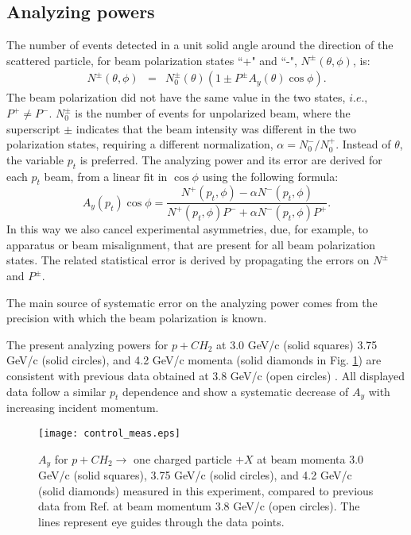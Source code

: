 \documentclass[epj]{svjour}
\newcommand\ba{\begin{eqnarray}}
\newcommand\ea{\end{eqnarray}}
\newcommand{\be}{\begin{equation}}
\newcommand{\ee}{\end{equation}}
\begin{document}
\subsection{Analyzing powers}
The number of events detected in a unit solid angle around the direction of the scattered particle,  for beam polarization states ``+" and ``-", $N^{\pm}(\theta, \phi)$, is:
\ba
N^{\pm} (\theta, \phi)&=& N_{0}^{\pm}(\theta) (1\pm P^{\pm} A_{y}(\theta)\cos\phi).
\ea
The beam polarization did not have the same value  in the two states, $i.e.,$ 
$P^{+} \neq P^{-} $.  $N_{0}^{\pm}$ is the number of events for unpolarized beam, where the superscript ${\pm}$ indicates  that the beam intensity was different in the two polarization states, requiring a different normalization, $\alpha=N_{0}^-/N_{0}^+$.
Instead of $\theta$, the variable $p_t$ is preferred. 
The analyzing power and its error are derived for each $p_t$ beam, from a linear fit in $\cos\phi $
using  the following formula:
\be
A_{y}(p_t) \cos\phi =\displaystyle\frac{N^+(p_t,\phi)- \alpha N^-(p_t,\phi)}
{N^+(p_t,\phi)P^- + \alpha N^-(p_t,\phi) P^+ }. 
\label{Eq:Asym}
\ee
In this way we also cancel experimental asymmetries, due, for example, to apparatus or beam misalignment, that are present for all beam polarization states. The related statistical error is derived by propagating the errors on $N^\pm$ and $P^\pm$. 

The main source of systematic error on the analyzing power comes from the precision with
which the beam polarization is known.

The present analyzing powers for $p+CH_2$ at 3.0  GeV/c  (solid squares) 3.75 GeV/c (solid circles), and 4.2 GeV/c momenta (solid diamonds in Fig. \ref{Fig:p+CH2_3-42}) are consistent with previous data obtained at 3.8 GeV/c (open circles)  \cite{Azhgirey:2004yk}. All displayed data follow a similar $p_t$ dependence and show a systematic decrease of $A_y$ with increasing incident momentum.

\begin{figure}[htp!]
\texttt{[image: control\_meas.eps]}
\caption{$A_y$ for $p+CH_2\to$ one charged particle $+X$ at beam momenta 3.0 GeV/c (solid squares), 3.75 GeV/c (solid circles), and 4.2 GeV/c (solid  diamonds) measured in this experiment, compared to  previous data from Ref. \cite{Azhgirey:2004yk} at beam momentum 3.8 GeV/c (open circles).  The lines represent eye guides through the data points.}
\label{Fig:p+CH2_3-42}
\end{figure}
\end{document}
